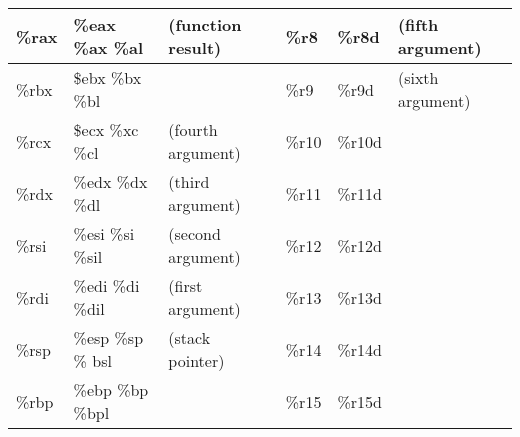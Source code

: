 \begin{tabular}{| l | l l | l | l l |}
    \hline 
    \%rax & \%eax \%ax \%al & (function result) & \%r8 & \%r8d & (fifth argument) \\
    \hline
    \%rbx & \$ebx \%bx \%bl & & \%r9 & \%r9d & (sixth argument) \\
    \hline 
    \%rcx & \$ecx \%xc \%cl & (fourth argument) & \%r10 & \%r10d & \\
    \hline 
    \%rdx & \%edx \%dx \%dl & (third argument)  & \%r11 & \%r11d & \\
    \hline 
    \%rsi & \%esi \%si \%sil & (second argument) & \%r12 & \%r12d & \\
    \hline 
    \%rdi & \%edi \%di \%dil & (first argument)  & \%r13 & \%r13d & \\
    \hline 
    \%rsp & \%esp \%sp \% bsl & (stack pointer)   & \%r14 & \%r14d & \\
    \hline 
    \%rbp & \%ebp \%bp \%bpl &                   & \%r15 & \%r15d & \\
    \hline 
\end{tabular}
